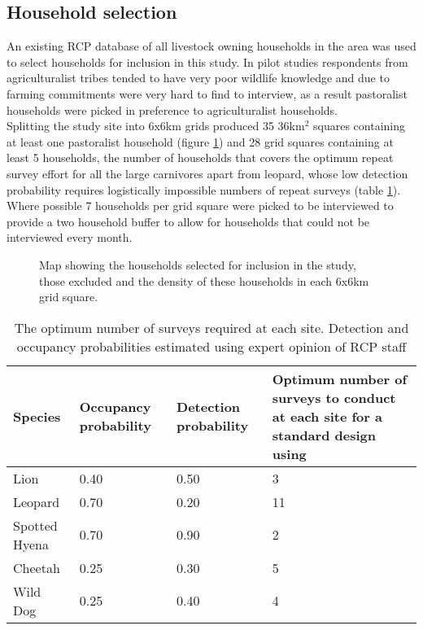 \subsection{Household selection}

An existing RCP database of all livestock owning households in the area was used to select households for inclusion in this study. In pilot studies respondents from agriculturalist tribes tended to have very poor wildlife knowledge and due to farming commitments were very hard to find to interview, as a result pastoralist households were picked in preference to agriculturalist households.\\

Splitting the study site into 6x6km grids produced 35 36km$^2$ squares containing at least one pastoralist household (figure \ref{fig:HH_selection}) and 28 grid squares containing at least 5 households, the number of households that covers the optimum repeat survey effort for all the large carnivores apart from leopard, whose low detection probability requires logistically impossible numbers of repeat surveys (table \ref{table:OptimumRepeats}). Where possible 7 households per grid square were picked to be interviewed to provide a two household buffer to allow for households that could not be interviewed every month.\\

\begin{figure}[h]
\centering
\setlength\fboxsep{0pt}
\setlength\fboxrule{0.5pt}
\caption{Map showing the households selected for inclusion in the study, those excluded and the density of these households in each 6x6km grid square.}
\label{fig:HH_selection}
\end{figure}

\begin{table}[h]
	\small
	\begin{center}
		\begin{tabular}{l p{3cm} p{3cm} p{5cm}}
			\hline \hline		
			Species 			& Occupancy probability	 	& Detection probability & Optimum number of surveys to conduct at each site for a standard design using \citet{MACKENZIE_2005}\\ \hline
			Lion 		& 0.40						& 0.50 & 3\\
			Leopard 	& 0.70						& 0.20 & 11\\
			Spotted 
			Hyena       & 0.70						& 0.90 & 2\\
			Cheetah 	& 0.25						& 0.30 & 5\\
			Wild Dog 	& 0.25						& 0.40 & 4\\
			\hline \hline						
		\end{tabular}
		\caption{The optimum number of surveys required at each site. Detection and occupancy probabilities estimated using expert opinion of RCP staff }
		\label{table:OptimumRepeats}
	\end{center}
\end{table}

